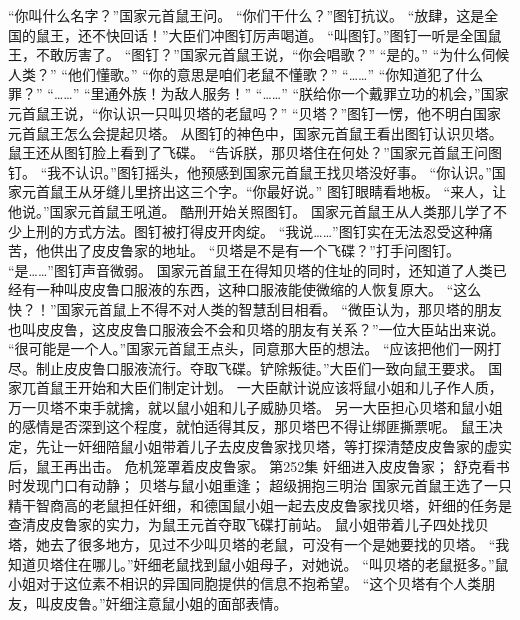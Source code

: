 \documentclass[a4paper,12pt,UTF8,twoside]{ctexbook}
\begin{document}
        “你叫什么名字？”国家元首鼠王问。  
        “你们干什么？”图钉抗议。  
        “放肆，这是全国的鼠王，还不快回话！”大臣们冲图钉厉声喝道。  
        “叫图钉。”图钉一听是全国鼠王，不敢厉害了。  
        “图钉？”国家元首鼠王说，“你会唱歌？”  
        “是的。”  
        “为什么伺候人类？”  
        “他们懂歌。”  
        “你的意思是咱们老鼠不懂歌？”  
        “……”  
        “你知道犯了什么罪？”  
        “……”        
        “里通外族！为敌人服务！”  
        “……”  
        “朕给你一个戴罪立功的机会，”国家元首鼠王说，“你认识一只叫贝塔的老鼠吗？”  
        “贝塔？”图钉一愣，他不明白国家元首鼠王怎么会提起贝塔。  
        从图钉的神色中，国家元首鼠王看出图钉认识贝塔。鼠王还从图钉脸上看到了飞碟。  
        “告诉朕，那贝塔住在何处？”国家元首鼠王问图钉。  
        “我不认识。”图钉摇头，他预感到国家元首鼠王找贝塔没好事。  
        “你认识。”国家元首鼠王从牙缝儿里挤出这三个字。“你最好说。”  
        图钉眼睛看地板。  
        “来人，让他说。”国家元首鼠王吼道。  
        酷刑开始关照图钉。  
        国家元首鼠王从人类那儿学了不少上刑的方式方法。图钉被打得皮开肉绽。  
        “我说……”图钉实在无法忍受这种痛苦，他供出了皮皮鲁家的地址。  
        “贝塔是不是有一个飞碟？”打手问图钉。  
        “是……”图钉声音微弱。  
        国家元首鼠王在得知贝塔的住址的同时，还知道了人类已经有一种叫皮皮鲁口服液的东西，这种口服液能使微缩的人恢复原大。  
        “这么快？！”国家元首鼠上不得不对人类的智慧刮目相看。  
        “微臣认为，那贝塔的朋友也叫皮皮鲁，这皮皮鲁口服液会不会和贝塔的朋友有关系？”一位大臣站出来说。  
        “很可能是一个人。”国家元首鼠王点头，同意那大臣的想法。  
        “应该把他们一网打尽。制止皮皮鲁口服液流行。夺取飞碟。铲除叛徒。”大臣们一致向鼠王要求。  
        国家兀首鼠王开始和大臣们制定计划。  
        一大臣献计说应该将鼠小姐和儿子作人质，万一贝塔不束手就擒，就以鼠小姐和儿子威胁贝塔。  
        另一大臣担心贝塔和鼠小姐的感情是否深到这个程度，就怕适得其反，那贝塔巴不得让绑匪撕票呢。  
        鼠王决定，先让一奸细陪鼠小姐带着儿子去皮皮鲁家找贝塔，等打探清楚皮皮鲁家的虚实后，鼠王再出击。  
        危机笼罩着皮皮鲁家。          第252集  
        奸细进入皮皮鲁家；  
        舒克看书时发现门口有动静；  
        贝塔与鼠小姐重逢；  
        超级拥抱三明治    
        国家元首鼠王选了一只精干智商高的老鼠担任奸细，和德国鼠小姐一起去皮皮鲁家找贝塔，奸细的任务是查清皮皮鲁家的实力，为鼠王元首夺取飞碟打前站。  
        鼠小姐带着儿子四处找贝塔，她去了很多地方，见过不少叫贝塔的老鼠，可没有一个是她要找的贝塔。  
        “我知道贝塔住在哪儿。”奸细老鼠找到鼠小姐母子，对她说。  
        “叫贝塔的老鼠挺多。”鼠小姐对于这位素不相识的异国同胞提供的信息不抱希望。        
        “这个贝塔有个人类朋友，叫皮皮鲁。”奸细注意鼠小姐的面部表情。  
\end{document}
